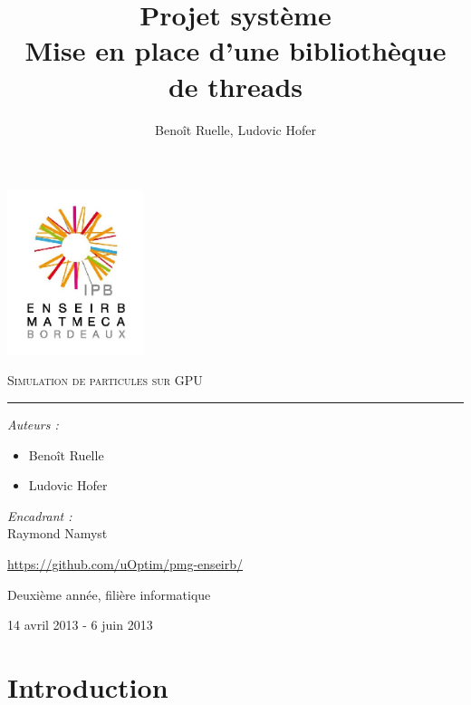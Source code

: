 \documentclass{article}
\title{Projet système \\ Mise en place d'une bibliothèque de threads}
\author{Benoît Ruelle, Ludovic Hofer}
\begin{document}
\begin{center}
  \includegraphics [width=40mm]{ENSEIRB-MATMECA.jpg} 


\textsc{\Huge Simulation de particules sur GPU}\\[0.5cm]
\rule{0.4\textwidth}{1pt}


\begin{center}
  
  \begin{flushleft}
    \large
    \emph{Auteurs :}\\
    \begin{itemize}
    \item Benoît Ruelle
    \item Ludovic Hofer
    \end{itemize}
  \end{flushleft}
  
  
  \begin{flushright}
    \large
    \emph{Encadrant :}\\
    Raymond Namyst
  \end{flushright}
\end{center}


{\large \url{https://github.com/uOptim/pmg-enseirb/}}


{\large Deuxième année, filière informatique} 
~

{\large 14 avril 2013 - 6 juin 2013}\\

\end{center}
\thispagestyle{empty}
\pagebreak
\tableofcontents
\newpage

\section{Introduction}
\end{document}
